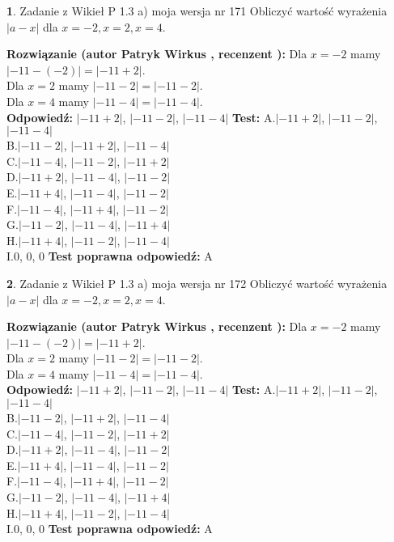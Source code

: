 \documentclass[12pt, a4paper]{article}
\theoremstyle{definition} %
\newtheorem{zad}{}
\newcommand{\zadStart}[1]{\begin{zad}#1\newline}
\newcommand{\zadStop}{\end{zad}}
\newcommand{\rozwStart}[2]{\noindent \textbf{Rozwiązanie (autor #1 , recenzent #2): }\newline}
\newcommand{\rozwStop}{\newline}
\newcommand{\odpStart}{\noindent \textbf{Odpowiedź:}\newline}
\newcommand{\odpStop}{\newline}
\newcommand{\testStart}{\noindent \textbf{Test:}\newline}
\newcommand{\testStop}{\newline}
\newcommand{\kluczStart}{\noindent \textbf{Test poprawna odpowiedź:}\newline}
\newcommand{\kluczStop}{\newline}
\begin{document}
\zadStart{Zadanie z Wikieł P 1.3 a) moja wersja nr 171}
Obliczyć wartość wyrażenia $|a - x|$ dla $x=-2,x=2,x=4$.
\zadStop
\rozwStart{Patryk Wirkus}{}
Dla $x = -2$ mamy $|-11 - (-2)| = |-11 + 2|$.\\
Dla $x = 2$ mamy $|-11 - 2| = |-11 - 2|$.\\
Dla $x = 4$ mamy $|-11 - 4| = |-11 - 4|$.\\
\rozwStop
\odpStart
$|-11 + 2|$, $|-11 - 2|$, $|-11 - 4|$
\odpStop
\testStart
A.$|-11 + 2|$, $|-11 - 2|$, $|-11 - 4|$\\
B.$|-11 - 2|$, $|-11 + 2|$, $|-11 - 4|$\\
C.$|-11 - 4|$, $|-11 - 2|$, $|-11 + 2|$\\
D.$|-11 + 2|$, $|-11 - 4|$, $|-11 - 2|$\\
E.$|-11 + 4|$, $|-11 - 4|$, $|-11 - 2|$\\
F.$|-11 - 4|$, $|-11 + 4|$, $|-11 - 2|$\\
G.$|-11 - 2|$, $|-11 - 4|$, $|-11 + 4|$\\
H.$|-11 + 4|$, $|-11 - 2|$, $|-11 - 4|$\\
I.$0$, $0$, $0$
\testStop
\kluczStart
A
\kluczStop



\zadStart{Zadanie z Wikieł P 1.3 a) moja wersja nr 172}
Obliczyć wartość wyrażenia $|a - x|$ dla $x=-2,x=2,x=4$.
\zadStop
\rozwStart{Patryk Wirkus}{}
Dla $x = -2$ mamy $|-11 - (-2)| = |-11 + 2|$.\\
Dla $x = 2$ mamy $|-11 - 2| = |-11 - 2|$.\\
Dla $x = 4$ mamy $|-11 - 4| = |-11 - 4|$.\\
\rozwStop
\odpStart
$|-11 + 2|$, $|-11 - 2|$, $|-11 - 4|$
\odpStop
\testStart
A.$|-11 + 2|$, $|-11 - 2|$, $|-11 - 4|$\\
B.$|-11 - 2|$, $|-11 + 2|$, $|-11 - 4|$\\
C.$|-11 - 4|$, $|-11 - 2|$, $|-11 + 2|$\\
D.$|-11 + 2|$, $|-11 - 4|$, $|-11 - 2|$\\
E.$|-11 + 4|$, $|-11 - 4|$, $|-11 - 2|$\\
F.$|-11 - 4|$, $|-11 + 4|$, $|-11 - 2|$\\
G.$|-11 - 2|$, $|-11 - 4|$, $|-11 + 4|$\\
H.$|-11 + 4|$, $|-11 - 2|$, $|-11 - 4|$\\
I.$0$, $0$, $0$
\testStop
\kluczStart
A
\kluczStop
\end{document}
